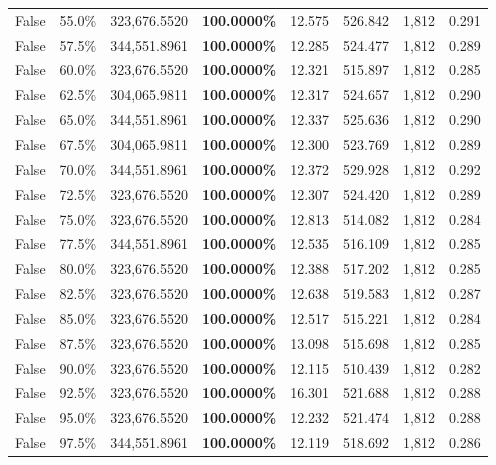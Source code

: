 \begin{table}[H]
\begin{tabular}{lllrllll}
\cline{1-8}
False & 55.0\% & 323,676.5520 & \bfseries \color{red} 100.0000\% & 12.575 & 526.842 & 1,812 & 0.291 \\
\cline{1-8}
False & 57.5\% & 344,551.8961 & \bfseries \color{red} 100.0000\% & 12.285 & 524.477 & 1,812 & 0.289 \\
\cline{1-8}
False & 60.0\% & 323,676.5520 & \bfseries \color{red} 100.0000\% & 12.321 & 515.897 & 1,812 & 0.285 \\
\cline{1-8}
False & 62.5\% & \color{red} 304,065.9811 & \bfseries \color{red} 100.0000\% & 12.317 & 524.657 & 1,812 & 0.290 \\
\cline{1-8}
False & 65.0\% & 344,551.8961 & \bfseries \color{red} 100.0000\% & 12.337 & 525.636 & 1,812 & 0.290 \\
\cline{1-8}
False & 67.5\% & \color{red} 304,065.9811 & \bfseries \color{red} 100.0000\% & 12.300 & 523.769 & 1,812 & 0.289 \\
\cline{1-8}
False & 70.0\% & 344,551.8961 & \bfseries \color{red} 100.0000\% & 12.372 & 529.928 & 1,812 & 0.292 \\
\cline{1-8}
False & 72.5\% & 323,676.5520 & \bfseries \color{red} 100.0000\% & 12.307 & 524.420 & 1,812 & 0.289 \\
\cline{1-8}
False & 75.0\% & 323,676.5520 & \bfseries \color{red} 100.0000\% & 12.813 & 514.082 & 1,812 & 0.284 \\
\cline{1-8}
False & 77.5\% & 344,551.8961 & \bfseries \color{red} 100.0000\% & 12.535 & 516.109 & 1,812 & 0.285 \\
\cline{1-8}
False & 80.0\% & 323,676.5520 & \bfseries \color{red} 100.0000\% & 12.388 & 517.202 & 1,812 & 0.285 \\
\cline{1-8}
False & 82.5\% & 323,676.5520 & \bfseries \color{red} 100.0000\% & 12.638 & 519.583 & 1,812 & 0.287 \\
\cline{1-8}
False & 85.0\% & 323,676.5520 & \bfseries \color{red} 100.0000\% & 12.517 & 515.221 & 1,812 & 0.284 \\
\cline{1-8}
False & 87.5\% & 323,676.5520 & \bfseries \color{red} 100.0000\% & 13.098 & 515.698 & 1,812 & 0.285 \\
\cline{1-8}
False & 90.0\% & 323,676.5520 & \bfseries \color{red} 100.0000\% & 12.115 & 510.439 & 1,812 & 0.282 \\
\cline{1-8}
False & 92.5\% & 323,676.5520 & \bfseries \color{red} 100.0000\% & 16.301 & 521.688 & 1,812 & 0.288 \\
\cline{1-8}
False & 95.0\% & 323,676.5520 & \bfseries \color{red} 100.0000\% & 12.232 & 521.474 & 1,812 & 0.288 \\
\cline{1-8}
False & 97.5\% & 344,551.8961 & \bfseries \color{red} 100.0000\% & 12.119 & 518.692 & 1,812 & 0.286 \\
\cline{1-8}
\bottomrule
\end{tabular}
\end{table}
